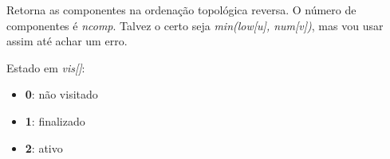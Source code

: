 Retorna as componentes na ordenação topológica reversa. O número de componentes é \textit{ncomp}.
Talvez o certo seja \textit{min(low[u], num[v])}, mas vou usar assim até achar um erro.

Estado em \textit{vis[]}:
\begin{itemize}
    \item \textbf{0}: não visitado
    \item \textbf{1}: finalizado
    \item \textbf{2}: ativo
\end{itemize}